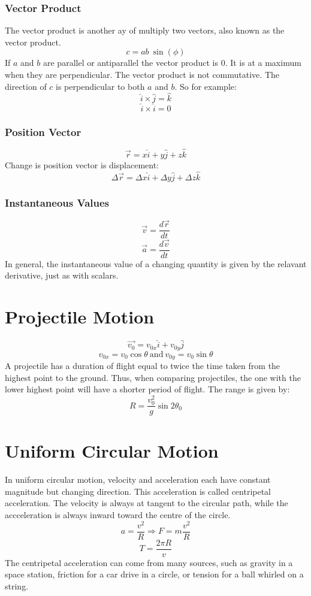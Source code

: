 \documentclass[12pt]{report}
\begin{document}
\subsubsection*{Vector Product}

The vector product is another ay of multiply two vectors, also known as the vector product.
\[c = ab\:\sin(\phi)\]
If \(a\) and \(b\) are parallel or antiparallel the vector product is \(0\). It is at a maximum
when they are perpendicular. The vector product is not commutative. The direction of \(c\)
is perpendicular to both \(a\) and \(b\). So for example:
\[\hat{i} \times \hat{j} = \hat{k}\]
\[\hat{i} \times \hat{i} = 0\]

\subsubsection*{Position Vector}
\[\vec{r} = x\hat{i} + y\hat{j} +z\hat{k}\]
Change is position vector is displacement:
\[\Delta\vec{r} = \Delta x \hat{i} + \Delta y \hat{j} + \Delta z \hat{k}\]

\subsubsection*{Instantaneous Values}
\[\vec{v} = \frac{d\vec{r}}{dt}\]
\[\vec{a} = \frac{d\vec{v}}{dt}\]
In general, the instantaneous value of a changing quantity is given by the relavant
derivative, just as with scalars.

\section*{Projectile Motion}
\[\vec{v_0} = v_{0x}\hat{i} + v_{0y}\hat{j}\]
\[v_{0x} = v_0\cos{\theta} \:\mathrm{and}\: v_{0y} = v_0\sin{\theta}\]
A projectile has a duration of flight equal to twice the time taken from the highest point to 
the ground. Thus, when comparing projectiles, the one with the lower highest point will
have a shorter period of flight. The range is given by:
\[R = \frac{v^2_0}{g}\sin 2 \theta_0\]

\section*{Uniform Circular Motion}
In uniform circular motion, velocity and acceleration each have constant magnitude but changing direction.
This acceleration is called centripetal acceleration. The velocity is always at tangent to the circular
path, while the accceleration is always inward toward the centre of the circle.
\[a = \frac{v^2}{R} \Rightarrow F = m\frac{v^2}{R}\]
\[T = \frac{2\pi R }{v}\]
The centripetal acceleration can come from many sources, such as gravity in a space station, friction for 
a car drive in a circle, or tension for a ball whirled on a string.
\end{document}
